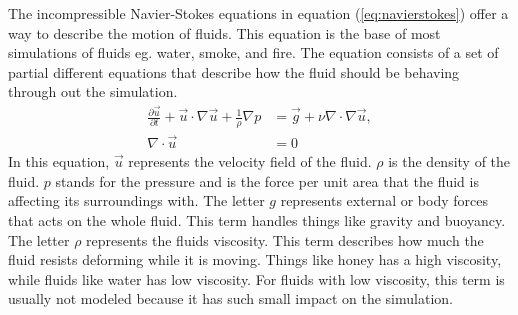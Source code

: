 The incompressible Navier-Stokes equations in equation (\ref{eq:navierstokes}) offer a way to describe the motion of fluids. 
This equation is the base of most simulations of fluids eg. water, smoke, and fire. 
The equation consists of a set of partial different equations that describe how the fluid should be behaving through out the simulation.
\begin{equation}
  \label{eq:navierstokes}
  \begin{split} 
    \frac{\partial \vec{u}}{\partial t} + \vec{u} \cdot \nabla \vec{u} + \frac{1}{\rho} \nabla p &= \vec{g} + \nu \nabla \cdot \nabla \vec{u},\\ 
    \nabla\cdot \vec{u} &= 0
  \end{split}
\end{equation}
In this equation, $\vec{u}$ represents the velocity field of the fluid. 
$\rho$ is the density of the fluid. 
$p$ stands for the pressure and is the force per unit area that the fluid is affecting its surroundings with. 
The letter $g$ represents external or body forces that acts on the whole fluid. 
This term handles things like gravity and buoyancy. 
The letter $\rho$ represents the fluids viscosity. 
This term describes how much the fluid resists deforming while it is moving. 
Things like honey has a high viscosity, while fluids like water has low viscosity. 
For fluids with low viscosity, this term is usually not modeled because it has such small impact on the simulation.
\\
\\